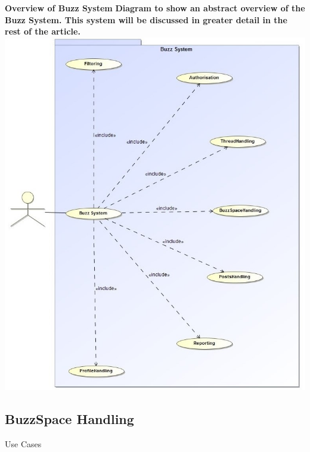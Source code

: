 \documentclass[a4paper,11pt]{article}
\begin{document}
\tableofcontents
\newpage
\setlength{\voffset}{-3cm}
\begin{center}
\textbf{\Huge{Overview of Buzz System}}
\textbf{\large{Diagram to show an abstract overview of the Buzz System. This system will be discussed in greater detail in the rest of the article.}}\\
\includegraphics[width=1\linewidth]{./Images/TotalOverview/Overview.jpg}\\
\end{center}
\newpage
\setlength{\voffset}{-3cm}

\begin{center}
\section{\textbf{\huge{BuzzSpace Handling}}}

\Large{Use Cases}
\end{center}
\end{document}
